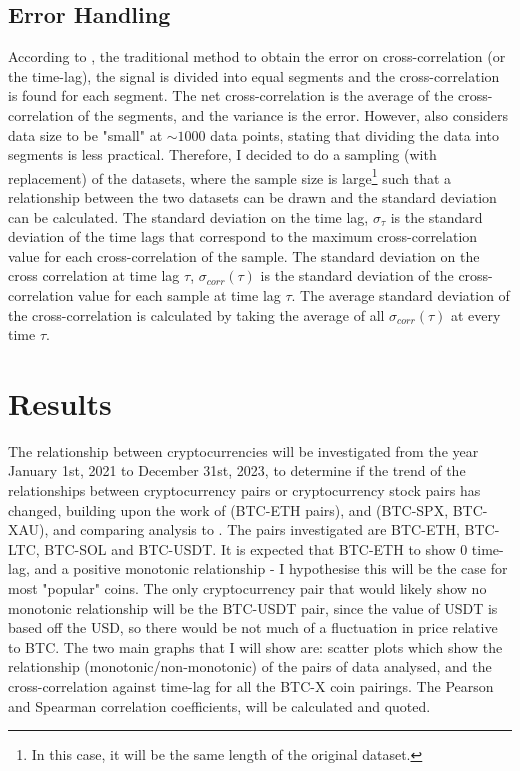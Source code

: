 \documentclass[a4paper, 10pt, conference]{ieeeconf}      %
\begin{document}
\subsection{Error Handling}
According to \cite{Misra2018}, the traditional method to obtain the error on cross-correlation (or the time-lag), the signal is divided into equal segments and the cross-correlation is found for each segment. The net cross-correlation is the average of the cross-correlation of the segments, and the variance is the error. However, \cite{Misra2018} also considers data size to be "small" at $\sim1000$ data points, stating that dividing the data into segments is less practical. Therefore, I decided to do a sampling (with replacement) of the datasets, where the sample size is large\footnote{In this case, it will be the same length of the original dataset.} such that a relationship between the two datasets can be drawn \cite{Kose2023} and the standard deviation can be calculated. The standard deviation on the time lag, $\sigma_\tau$ is the standard deviation of the time lags that correspond to the maximum cross-correlation value for each cross-correlation of the sample. The standard deviation on the cross correlation at time lag $\tau$, $\sigma_{corr}(\tau)$ is the standard deviation of the cross-correlation value for each sample at time lag $\tau$. The average standard deviation of the cross-correlation is calculated by taking the average of all $\sigma_{corr}(\tau)$ at every time $\tau$.

\section{Results}
The relationship between cryptocurrencies will be investigated from the year January 1st, 2021 to December 31st, 2023, to determine if the trend of the relationships between cryptocurrency pairs or cryptocurrency stock pairs has changed, building upon the work of \cite{Sifat2019} (BTC-ETH pairs), and \cite{Georgoula2015} (BTC-SPX, BTC-XAU), and comparing analysis to \cite{Corbet2020contagion}. The pairs investigated are BTC-ETH, BTC-LTC, BTC-SOL and BTC-USDT. It is expected that BTC-ETH to show 0 time-lag, and a positive monotonic relationship - I hypothesise this will be the case for most "popular" coins. The only cryptocurrency pair that would likely show no monotonic relationship will be the BTC-USDT pair, since the value of USDT is based off the USD, so there would be not much of a fluctuation in price relative to BTC. The two main graphs that I will show are: scatter plots which show the relationship (monotonic/non-monotonic) of the pairs of data analysed, and the cross-correlation against time-lag for all the BTC-X coin pairings. The Pearson and Spearman correlation coefficients,  will be calculated and quoted.
\end{document}

